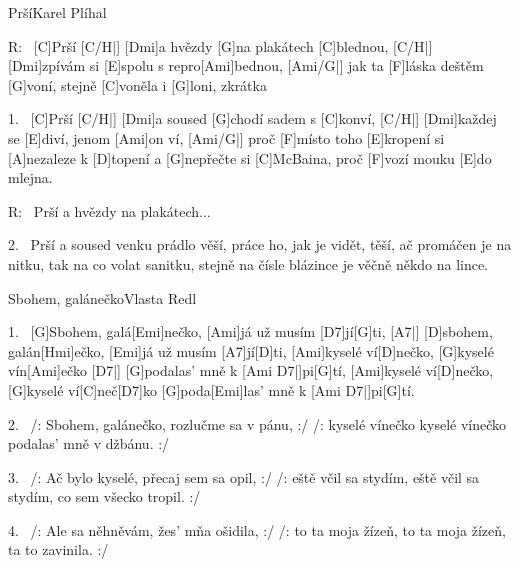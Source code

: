 \begin{song}{Prší}{Karel Plíhal}

\begin{xverse}{R:~}
[C]Prší [C/H|]{} [Dmi]a hvězdy [G]na plakátech [C]blednou, [C/H|]{}
[Dmi]zpívám si [E]spolu s repro[Ami]bednou, [Ami/G|]{}
jak ta [F]láska deštěm [G]voní,
stejně [C]voněla i [G]loni, zkrátka
\end{xverse}

\begin{xverse}{1.~}
[C]Prší [C/H|]{} [Dmi]a soused [G]chodí sadem s [C]konví, [C/H|]{}
[Dmi]každej se [E]diví, jenom [Ami]on ví, [Ami/G|]{}
proč [F]místo toho [E]kropení si [A]nezaleze k [D]topení
a [G]nepřečte si [C]McBaina, proč [F]vozí mouku [E]do mlejna.
\end{xverse}

\begin{xverse}{R:~}
Prší a hvězdy na plakátech...
\end{xverse}

\begin{xverse}{2.~}
Prší a soused venku prádlo věší,
práce ho, jak je vidět, těší,
ač promáčen je na nitku, tak na co volat sanitku,
stejně na čísle blázince je věčně někdo na lince.
\end{xverse}

\end{song}


\begin{song}{Sbohem, galánečko}{Vlasta Redl}

\begin{xverse}{1.~}
[G]Sbohem, galá[Emi]nečko, [Ami]já už musím [D7]jí[G]ti, [A7|]{}
[D]sbohem, galán[Hmi]ečko, [Emi]já už musím [A7]jí[D]ti,
[Ami]kyselé ví[D]nečko, [G]kyselé vín[Ami]ečko [D7|]{}  [G]podalas' mně k [Ami D7|]pi[G]tí,
[Ami]kyselé ví[D]nečko, [G]kyselé ví[C]neč[D7]ko [G]poda[Emi]las' mně k [Ami D7|]pi[G]tí.
\end{xverse}

\begin{xverse}{2.~}
/: Sbohem, galánečko, rozlučme sa v pánu, :/
/: kyselé vínečko kyselé vínečko podalas' mně v džbánu. :/
\end{xverse}

\begin{xverse}{3.~}
/: Ač bylo kyselé, přecaj sem sa opil, :/
/: eště včil sa stydím, eště včil sa stydím, co sem všecko tropil. :/
\end{xverse}

\begin{xverse}{4.~}
/: Ale sa něhněvám, žes' mňa ošidila, :/
/: to ta moja žízeň, to ta moja žízeň, ta to zavinila. :/
\end{xverse}

\end{song}


